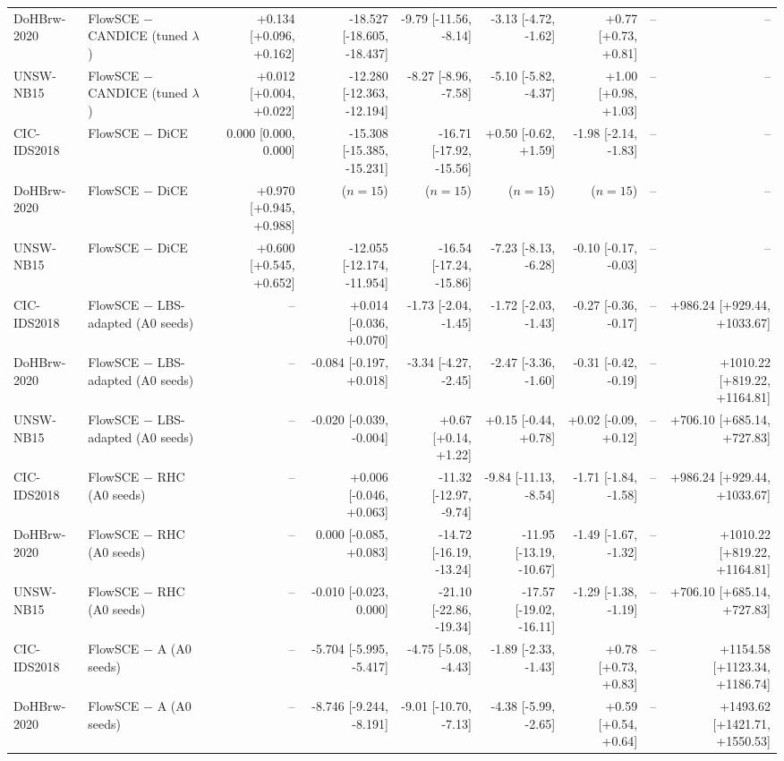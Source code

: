 \begin{table}[t]
\begin{tabular}{@{}llrrrrrrr@{}}
DoHBrw-2020 & FlowSCE $-$ CANDICE (tuned $\lambda$) & +0.134 [+0.096, +0.162] & -18.527 [-18.605, -18.437] & -9.79 [-11.56, -8.14] & -3.13 [-4.72, -1.62] & +0.77 [+0.73, +0.81] & -- & -- \\
UNSW-NB15 & FlowSCE $-$ CANDICE (tuned $\lambda$) & +0.012 [+0.004, +0.022] & -12.280 [-12.363, -12.194] & -8.27 [-8.96, -7.58] & -5.10 [-5.82, -4.37] & +1.00 [+0.98, +1.03] & -- & -- \\
CIC-IDS2018 & FlowSCE $-$ DiCE & 0.000 [0.000, 0.000] & -15.308 [-15.385, -15.231] & -16.71 [-17.92, -15.56] & +0.50 [-0.62, +1.59] & -1.98 [-2.14, -1.83] & -- & -- \\
DoHBrw-2020 & FlowSCE $-$ DiCE & +0.970 [+0.945, +0.988] & ($n=15$) & ($n=15$) & ($n=15$) & ($n=15$) & -- & -- \\
UNSW-NB15 & FlowSCE $-$ DiCE & +0.600 [+0.545, +0.652] & -12.055 [-12.174, -11.954] & -16.54 [-17.24, -15.86] & -7.23 [-8.13, -6.28] & -0.10 [-0.17, -0.03] & -- & -- \\
CIC-IDS2018 & FlowSCE $-$ LBS-adapted (A0 seeds) & -- & +0.014 [-0.036, +0.070] & -1.73 [-2.04, -1.45] & -1.72 [-2.03, -1.43] & -0.27 [-0.36, -0.17] & -- & +986.24 [+929.44, +1033.67] \\
DoHBrw-2020 & FlowSCE $-$ LBS-adapted (A0 seeds) & -- & -0.084 [-0.197, +0.018] & -3.34 [-4.27, -2.45] & -2.47 [-3.36, -1.60] & -0.31 [-0.42, -0.19] & -- & +1010.22 [+819.22, +1164.81] \\
UNSW-NB15 & FlowSCE $-$ LBS-adapted (A0 seeds) & -- & -0.020 [-0.039, -0.004] & +0.67 [+0.14, +1.22] & +0.15 [-0.44, +0.78] & +0.02 [-0.09, +0.12] & -- & +706.10 [+685.14, +727.83] \\
CIC-IDS2018 & FlowSCE $-$ RHC (A0 seeds) & -- & +0.006 [-0.046, +0.063] & -11.32 [-12.97, -9.74] & -9.84 [-11.13, -8.54] & -1.71 [-1.84, -1.58] & -- & +986.24 [+929.44, +1033.67] \\
DoHBrw-2020 & FlowSCE $-$ RHC (A0 seeds) & -- & 0.000 [-0.085, +0.083] & -14.72 [-16.19, -13.24] & -11.95 [-13.19, -10.67] & -1.49 [-1.67, -1.32] & -- & +1010.22 [+819.22, +1164.81] \\
UNSW-NB15 & FlowSCE $-$ RHC (A0 seeds) & -- & -0.010 [-0.023, 0.000] & -21.10 [-22.86, -19.34] & -17.57 [-19.02, -16.11] & -1.29 [-1.38, -1.19] & -- & +706.10 [+685.14, +727.83] \\
CIC-IDS2018 & FlowSCE $-$ A (A0 seeds) & -- & -5.704 [-5.995, -5.417] & -4.75 [-5.08, -4.43] & -1.89 [-2.33, -1.43] & +0.78 [+0.73, +0.83] & -- & +1154.58 [+1123.34, +1186.74] \\
DoHBrw-2020 & FlowSCE $-$ A (A0 seeds) & -- & -8.746 [-9.244, -8.191] & -9.01 [-10.70, -7.13] & -4.38 [-5.99, -2.65] & +0.59 [+0.54, +0.64] & -- & +1493.62 [+1421.71, +1550.53] \\

\end{tabular}
\end{table}
